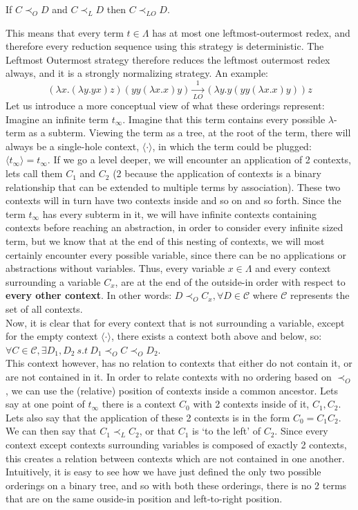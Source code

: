 \documentclass[11pt]{article}
\begin{document}
\begin{center}
  If $C \prec_{O} D$ and $C \prec_{L} D$ then $C \prec_{LO} D$.
\end{center}
This means that every term $t \in \Lambda$ has at most one leftmost-outermost redex, and therefore every reduction sequence using this strategy is deterministic. The Leftmost Outermost strategy therefore reduces the leftmost outermost redex always, and it is a strongly normalizing strategy. An example:
\begin{equation*}
  (\lambda x . (\lambda y . y x) z) (y y (\lambda x . x) y) \xrightarrow[LO]{1} (\lambda y . y (y y (\lambda x . x) y )) z
\end{equation*}
Let us introduce a more conceptual view of what these orderings represent: Imagine an infinite term $t_\infty$. Imagine that this term contains every possible $\lambda$-term as a subterm. Viewing the term as a tree, at the root of the term, there will always be a single-hole context, $\langle \cdot \rangle$, in which the term could be plugged: $\langle t_\infty \rangle = t_\infty$. If we go a level deeper, we will encounter an application of 2 contexts, lets call them $C_1$ and $C_2$ (2 because the application of contexts is a binary relationship that can be extended to multiple terms by association). These two contexts will in turn have two contexts inside and so on and so forth. Since the term $t_\infty$ has every subterm in it, we will have infinite contexts containing contexts before reaching an abstraction, in order to consider every infinite sized term, but we know that at the end of this nesting of contexts, we will most certainly encounter every possible variable, since there can be no applications or abstractions without variables. Thus, every variable $x \in \Lambda$ and every context surrounding a variable $C_x$, are at the end of the outside-in order with respect to \textbf{every other context}. In other words: $D \prec_O C_x , \forall D \in \mathcal{C}$ where $\mathcal{C}$ represents the set of all contexts. \\
Now, it is clear that for every context that is not surrounding a variable, except for the empty context $\langle \cdot \rangle$, there exists a context both above and below, so: $\forall C \in \mathcal{C}, \exists D_1, D_2 \ s.t \ D_1 \prec_O C \prec_O D_2$. \\ This context however, has no relation to contexts that either do not contain it, or are not contained in it. In order to relate contexts with no ordering based on $\prec_O$, we can use the (relative) position of contexts inside a common ancestor. Lets say at one point of $t_\infty$ there is a context $C_0$ with 2 contexts inside of it, $C_1,C_2$. Lets also say that the application of these 2 contexts is in the form $C_0 = C_1C_2$. We can then say that $C_1 \prec_L C_2$, or that $C_1$ is \enquote*{to the left} of $C_2$. Since every context except contexts surrounding variables is composed of exactly 2 contexts, this creates a relation between contexts which are not contained in one another.
\\
Intuitively, it is easy to see how we have just defined the only two possible orderings on a binary tree, and so with both these orderings, there is no 2 terms that are on the same ouside-in position and left-to-right position.
\end{document}
